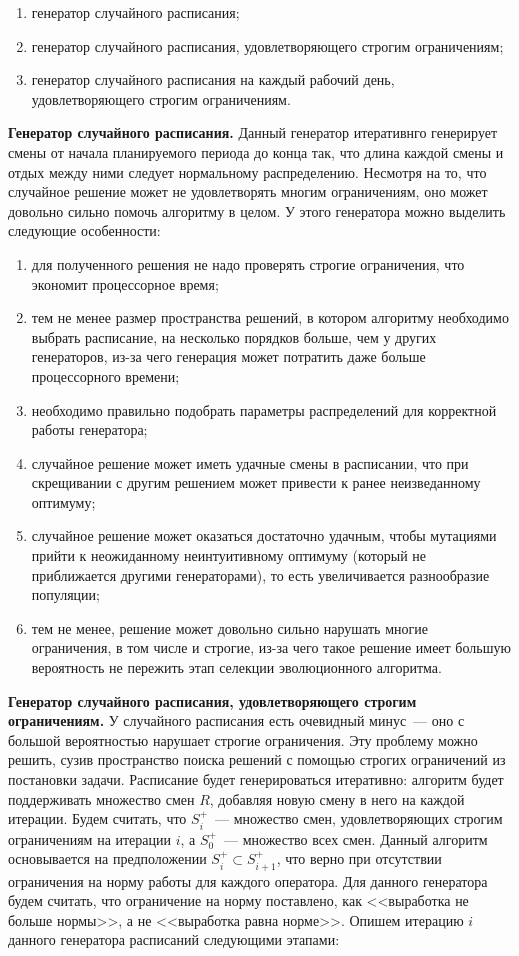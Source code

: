 \documentclass[times,specification,annotation]{itmo-student-thesis}
\begin{document}
\begin{enumerate}
    \item генератор случайного расписания;
    \item генератор случайного расписания, удовлетворяющего строгим ограничениям;
    \item генератор случайного расписания на каждый рабочий день, удовлетворяющего строгим ограничениям.
\end{enumerate}

\textbf{Генератор случайного расписания.}
Данный генератор итеративнго генерирует смены от начала планируемого периода до конца так, что длина каждой смены и отдых между ними следует нормальному распределению.
Несмотря на то, что случайное решение может не удовлетворять многим ограничениям, оно может довольно сильно помочь алгоритму в целом.
У этого генератора можно выделить следующие особенности:

\begin{enumerate}
    \item для полученного решения не надо проверять строгие ограничения, что экономит процессорное время;
    \item тем не менее размер пространства решений, в котором алгоритму необходимо выбрать расписание, на несколько порядков больше, чем у других генераторов, из-за чего генерация может потратить даже больше процессорного времени;
    \item необходимо правильно подобрать параметры распределений для корректной работы генератора;
    \item случайное решение может иметь удачные смены в расписании, что при скрещивании с другим решением может привести к ранее неизведанному оптимуму;
    \item случайное решение может оказаться достаточно удачным, чтобы мутациями прийти к неожиданному неинтуитивному оптимуму (который не приближается другими генераторами), то есть увеличивается разнообразие популяции;
    \item тем не менее, решение может довольно сильно нарушать многие ограничения, в том числе и строгие, из-за чего такое решение имеет большую вероятность не пережить этап селекции эволюционного алгоритма.
\end{enumerate}

\textbf{Генератор случайного расписания, удовлетворяющего строгим ограничениям.}
У случайного расписания есть очевидный минус~--- оно с большой вероятностью нарушает строгие ограничения.
Эту проблему можно решить, сузив пространство поиска решений с помощью строгих ограничений из постановки задачи.
Расписание будет генерироваться итеративно: алгоритм будет поддерживать множество смен $R$, добавляя новую смену в него на каждой итерации.
Будем считать, что $S^+_i$~--- множество смен, удовлетворяющих строгим ограничениям на итерации $i$, а $S^+_0$~--- множество всех смен.
Данный алгоритм основывается на предположении $S^+_i \subset S^+_{i + 1}$, что верно при отсутствии ограничения на норму работы для каждого оператора.
Для данного генератора будем считать, что ограничение на норму поставлено, как <<выработка не больше нормы>>, а не <<выработка равна норме>>.
Опишем итерацию $i$ данного генератора расписаний следующими этапами:
\end{document}
